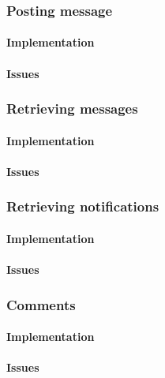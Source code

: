 \subsubsection*{Posting message}

\paragraph*{Implementation}

\paragraph*{Issues}


\subsubsection*{Retrieving messages}

\paragraph*{Implementation}

\paragraph*{Issues}


\subsubsection*{Retrieving notifications}

\paragraph*{Implementation}

\paragraph*{Issues}


\subsubsection*{Comments}

\paragraph*{Implementation}

\paragraph*{Issues}


